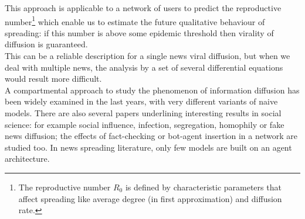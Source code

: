 This approach is applicable to a network of users to predict the reproductive 
number\footnote{The reproductive number $R_{0}$ is defined by characteristic
  parameters that affect spreading like average degree (in first
  approximation) and diffusion rate. } 
which enable us to estimate the future qualitative behaviour of spreading: 
if this number is above some epidemic threshold then virality of diffusion
is guaranteed.\\
This can be a reliable description for a single news viral diffusion, but
when we deal with multiple news, the analysis by a set of several
differential equations would result more difficult.\\
A compartmental approach to study the phenomenon of information diffusion
has been widely examined in the last years, with very different variants
of naive models.\cite{fedewa2013spread}\cite{tambuscio2016network}
There are also several papers underlining interesting results in social
science: for example social influence, infection,
segregation,\cite{henry2011emergence} homophily\cite{aiello2012friendship}
or fake news diffusion;\cite{tambuscio2016network}\cite{nekovee2007theory}
the effects of fact-checking or bot-agent insertion\cite{aiello2012people}
in a network are studied too.
In news spreading literature, only few models are built on an agent
architecture.\cite{liu2011rumor}\cite{serrano2015novel}\cite{seo2012identifying}\cite{de2013simulation}\cite{serrano2016validating}

